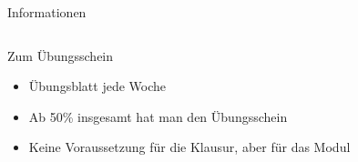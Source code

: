 {\begin{frame}{Informationen}
\begin{columns}
\begin{column}{0.5\textwidth}
			\begin{block}{Zum Übungsschein}
				\begin{itemize}
					\item Übungsblatt jede Woche
					\item Ab 50\% insgesamt hat man den Übungsschein
					\item Keine Voraussetzung für die Klausur, aber für das Modul
				\end{itemize}
			\end{block}
			
		\end{column}
	\end{columns}
	
\end{frame}

}{}